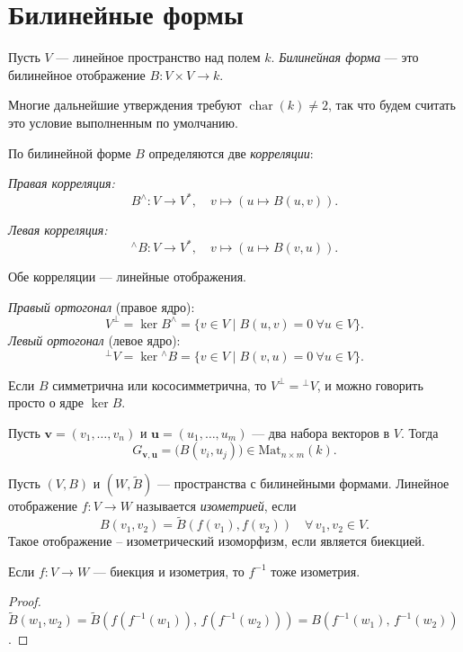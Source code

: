 \section{Билинейные формы}

\begin{definition}
    Пусть $V$ --- линейное пространство над полем $k$. 
    \emph{Билинейная форма} --- это билинейное отображение $B\colon V \times V \to k$.
\end{definition}

\begin{remark}
    Многие дальнейшие утверждения требуют $\operatorname{char}(k) \ne 2$, так что будем считать это условие выполненным по умолчанию.
\end{remark}


\begin{definition}
    По билинейной форме $B$ определяются две \emph{корреляции}:

    \emph{Правая корреляция:}
    \[
        B^{\wedge}\colon V \to V^*, \quad v \mapsto (u \mapsto B(u, v)).
    \]

    \emph{Левая корреляция:}
    \[
        {}^{\wedge}\!B\colon V \to V^*, \quad v \mapsto (u \mapsto B(v, u)).
    \]
    
    Обе корреляции --- линейные отображения.
\end{definition}


\begin{definition}
    \emph{Правый ортогонал} (правое ядро):
    \[
        V^\perp = \ker B^{\wedge} = \{v \in V \mid B(u, v) = 0\ \forall u \in V\}.
    \]
    \emph{Левый ортогонал} (левое ядро):
    \[
        {}^\perp V = \ker {}^{\wedge}\!B = \{v \in V \mid B(v, u) = 0\ \forall u \in V\}.
    \]
\end{definition}


\begin{remark}
    Если $B$ симметрична или кососимметрична, то $V^\perp = {}^\perp V$, и можно говорить просто о ядре $\ker B$.
\end{remark}


\begin{definition}
    Пусть $\mathbf{v} = (v_1, \dots, v_n)$ и $\mathbf{u} = (u_1, \dots, u_m)$ --- два набора векторов в $V$. Тогда
    \[
        G_{\mathbf{v}, \mathbf{u}} = \bigl(B(v_i, u_j)\bigr) \in \mathrm{Mat}_{n \times m}(k).
    \]
\end{definition}

\begin{definition}[Изометрия]
    Пусть $(V, B)$ и $(W, \widetilde{B})$ --- пространства с билинейными формами. Линейное отображение $f\colon V \to W$ называется \emph{изометрией}, если
    \[
        B(v_1, v_2) = \widetilde{B}(f(v_1), f(v_2)) \quad \forall\, v_1, v_2 \in V.
    \]
    Такое отображение -- изометрический  изоморфизм, если является биекцией.
\end{definition}


\begin{stmt}
    Если $f\colon V \to W$ --- биекция и изометрия, то $f^{-1}$ тоже изометрия.
    \begin{proof}
        $\widetilde{B}(w_1, w_2) = \widetilde{B}(f(f^{-1}(w_1)),\, f(f^{-1}(w_2))) = B(f^{-1}(w_1),\, f^{-1}(w_2))$.
    \end{proof}
\end{stmt}
